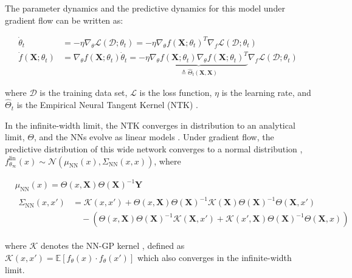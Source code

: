 \documentclass[a4paper,12pt]{article}
\begin{document}
The parameter dynamics and the predictive dynamics for this model under gradient flow can be written as:

\begin{align}
  \dot{\theta}_t &= -\eta \nabla_{\theta} \mathcal{L}\left(\mathcal{D}; \theta_t\right) = -\eta \nabla_{\theta} f\left(\mathbf{X}; \theta_t\right)^T \nabla_{f} \mathcal{L}(\mathcal{D}; \theta_t) \\
  \dot{f}(\mathbf{X}; \theta_t) &= \nabla_{\theta}f(\mathbf{X};\theta_t) \dot{\theta}_t = -\eta \underbrace{\nabla_{\theta} f(\mathbf{X}; \theta_t) \nabla_{\theta} f(\mathbf{X}; \theta_t)^T}_{\triangleq \hat{\Theta}_t(\mathbf{X}, \mathbf{X})} \nabla_{f} \mathcal{L}(\mathcal{D}; \theta_t)
\end{align}

where $\mathcal{D}$ is the training data set, $\mathcal{L}$ is the loss function, $\eta$ is the learning rate, and $\hat{\Theta}_t$ is the Empirical Neural Tangent Kernel (NTK) \citep{jacot_2018_ntk}. 

In the infinite-width limit, the NTK converges in distribution to an analytical limit, $\Theta$, and the NNs evolve as linear models \cite{lee_2019_wide-nets-linear}. Under gradient flow, the predictive distribution of this wide network converges to a normal distribution \cite{lee_2019_wide-nets-linear}, $f^{\text{lin}}_{\theta_{\infty}}\left(x\right) \sim \mathcal{N}\left(\mu_{\text{NN}}\left(x\right),\Sigma_{\text{NN}}\left(x,x\right)\right)$, where

\begin{align}
  &\mu_{\text{NN}}\left(x\right) = \Theta\left(x,\mathbf{X}\right) \Theta\left(\mathbf{X}\right)^{-1} \mathbf{Y} \\
  &\begin{split}
    \Sigma_{\text{NN}}\left(x,x'\right) &= \mathcal{K}\left(x,x'\right) + \Theta\left(x,\mathbf{X}\right) \Theta\left(\mathbf{X}\right)^{-1} \mathcal{K}\left(\mathbf{X}\right) \Theta\left(\mathbf{X}\right)^{-1} \Theta\left(\mathbf{X},x'\right) \\
    &\quad - \left(\Theta\left(x,\mathbf{X}\right) \Theta\left(\mathbf{X}\right)^{-1} \mathcal{K}\left(\mathbf{X},x'\right) +
    \mathcal{K}\left(x',\mathbf{X}\right) \Theta\left(\mathbf{X}\right)^{-1} \Theta\left(\mathbf{X},x\right)\right)
  \end{split}
\end{align}

where $\mathcal{K}$ denotes the NN-GP kernel \cite{matthews2018gaussianprocessbehaviourwide}, defined as 
$
    \mathcal{K}\left(x,x'\right) = \mathbb{E} \left[f_{\theta}\left(x\right) \cdot f_{\theta}\left(x'\right)\right]
$
which also converges in the infinite-width limit.
\end{document}
